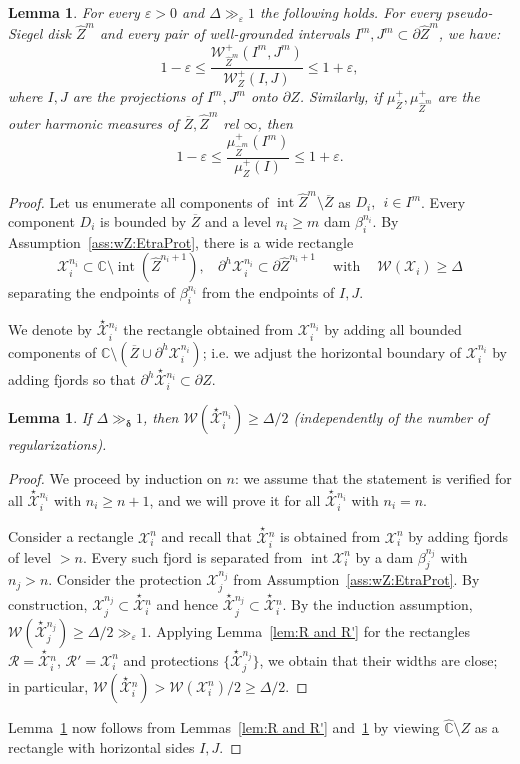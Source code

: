 \documentclass{amsart}
\renewcommand{\sp}{{\ \ }}
\newcommand{\1}{{\mathbb 1 }}
\newcommand{\upstar}[1]{\overset{\star}{ #1}{}}
\newcommand{\Width}{{\mathcal W}}
\newcommand{\bDelta}{{\mathbb{\Delta}}}
\newcommand\RR{\mathcal{R}}
\newcommand\XX{\mathcal{X}}
\newcommand\intr{\operatorname{int}}
\newcommand{\wZ}{{\widehat Z}}
\newcommand{\wC}{\widehat{\mathbb{C}}}
\newcommand{\C}{\mathbb{C}}
\newtheorem{lem}[thm]{Lemma}
\theoremstyle{remark}
\numberwithin{equation}{section}
\theoremstyle{definition}
\newcommand{\bdelta}{{\boldsymbol{ \delta}}}
\begin{document}
\begin{lem}
\label{lem:W^+:well grnd int}
For every $\varepsilon>0$ and $\bDelta\gg_\varepsilon 1 $ the following holds. For  every pseudo-Siegel disk $\wZ^m$ and every pair of well-grounded intervals $I^m,J^m\subset \partial \wZ^m$, we have:
\[ 1-\varepsilon \le\frac{\Width^+_{\wZ^m} (I^m,J^m)}{\Width^+_{Z} (I,J)} \le 1+\varepsilon,\]
where $I,J$ are the projections of $I^m,J^m$ onto $\partial Z$. Similarly, if $\mu^+_{\overline Z}, \mu^+_{\wZ^m}$ are the outer harmonic measures of $\overline Z,\wZ^m$ rel $\infty$, then 
\[ 1-\varepsilon \le \frac{\mu^+_{\wZ^m} (I^m)}{\mu^+_{Z} (I)} \le 1+\varepsilon.\]
\end{lem}

\begin{proof}
Let us enumerate all components of $\intr \wZ^m\setminus \overline Z$ as $D_i,\sp i\in I^m$. Every component $D_i$ is bounded by $\overline Z$ and a level $n_i\ge m$ dam $\beta^{n_i}_i$. By  Assumption~\ref{ass:wZ:EtraProt}, there is a wide rectangle 
\[\XX^{n_i}_{i}\subset \C\setminus \intr(\wZ^{n_i+1}), \sp\sp \partial^h\XX^{n_i}_{i}\subset \partial \wZ^{n_i+1} \sp\sp\text{ with }\sp\sp \Width(\XX_{i})\ge \bDelta\]
separating the endpoints of $\beta^{n_i}_i$ from the endpoints of $I,J$.

We denote by $\upstar \XX^{n_i}_i$ the rectangle obtained from $\XX^{n_i}_i$ by adding all bounded components of $\C\setminus (\overline Z\cup \partial ^h \XX^{n_i}_i )$; i.e. we adjust the horizontal boundary of $\XX^{n_i}_i$ by adding fjords so that $\partial ^h \upstar \XX^{n_i}_i\subset \partial Z$. 




 \begin{lem}
 \label{lem:CompInter:prf}
   If $\bDelta\gg_\bdelta 1$, then $\Width(\upstar\XX^{n_i}_i)\ge \bDelta/2$ (independently of the number of regularizations). 
 \end{lem}
\begin{proof}
We proceed by induction on $n$: we assume that the statement is verified for all $\upstar \XX^{n_i}_i$ with $n_i\ge n+1$, and we will prove it for all $\upstar \XX^{n_i}_i$ with $n_i=n$.

Consider a rectangle $\XX^n_i$ and recall that $\upstar\XX^n_i$ is obtained from $\XX^n_i$ by adding fjords of level $>n$. Every such fjord is separated from $\intr \XX^n_i$ by a dam $\beta_j^{n_j}$ with $n_j>n$. Consider the protection $\XX_j^{n_j}$ from Assumption~\ref{ass:wZ:EtraProt}. By construction, $\XX_j^{n_j}\subset \upstar\XX_i^n$ and hence $\upstar \XX_j^{n_j}\subset \upstar \XX_i^n$. By the induction assumption, $\Width(\upstar \XX_j^{n_j}) \ge \bDelta/2\gg_\varepsilon 1$. Applying Lemma~\ref{lem:R and R'} for the rectangles $\RR=\upstar \XX^n_i$, $\RR'=\XX^n_i$ and protections $\{\upstar \XX_j^{n_j}\}$, we obtain that their widths are close; in particular, $\Width(\upstar \XX^n_i)> \Width (\XX^n_i)/2\ge \bDelta/2$.
\end{proof}

 Lemma~\ref{lem:W^+:well grnd int} now follows from Lemmas~\ref{lem:R and R'} and~\ref{lem:CompInter:prf} by viewing $\wC\setminus Z$ as a rectangle with horizontal sides $I,J$.
\end{proof}
\end{document}
